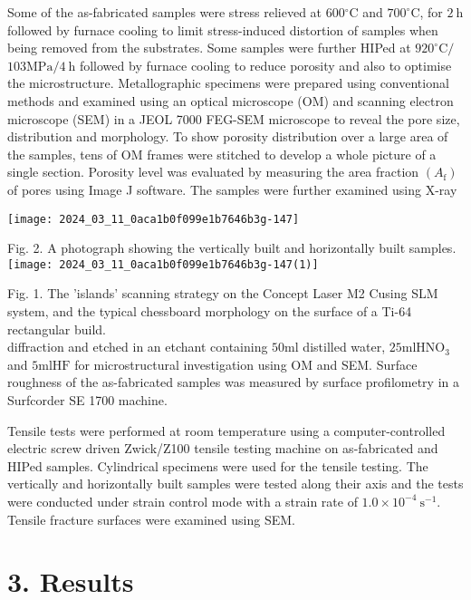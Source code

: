 \documentclass[10pt]{article}
\begin{document}
Some of the as-fabricated samples were stress relieved at $600{ }^{\circ} \mathrm{C}$ and $700^{\circ} \mathrm{C}$, for $2 \mathrm{~h}$ followed by furnace cooling to limit stress-induced distortion of samples when being removed from the substrates. Some samples were further HIPed at $920^{\circ} \mathrm{C} /$ $103 \mathrm{MPa} / 4 \mathrm{~h}$ followed by furnace cooling to reduce porosity and also to optimise the microstructure. Metallographic specimens were prepared using conventional methods and examined using an optical microscope (OM) and scanning electron microscope (SEM) in a JEOL 7000 FEG-SEM microscope to reveal the pore size, distribution and morphology. To show porosity distribution over a large area of the samples, tens of OM frames were stitched to develop a whole picture of a single section. Porosity level was evaluated by measuring the area fraction $\left(A_{\mathrm{f}}\right)$ of pores using Image J software. The samples were further examined using X-ray

\begin{center}
\texttt{[image: 2024\_03\_11\_0aca1b0f099e1b7646b3g-147]}
\end{center}

Fig. 2. A photograph showing the vertically built and horizontally built samples.\\
\texttt{[image: 2024\_03\_11\_0aca1b0f099e1b7646b3g-147(1)]}

Fig. 1. The 'islands' scanning strategy on the Concept Laser M2 Cusing SLM system, and the typical chessboard morphology on the surface of a Ti-64 rectangular build.\\
diffraction and etched in an etchant containing $50 \mathrm{ml}$ distilled water, $25 \mathrm{ml} \mathrm{HNO}_{3}$ and $5 \mathrm{ml} \mathrm{HF}$ for microstructural investigation using OM and SEM. Surface roughness of the as-fabricated samples was measured by surface profilometry in a Surfcorder SE 1700 machine.

Tensile tests were performed at room temperature using a computer-controlled electric screw driven Zwick/Z100 tensile testing machine on as-fabricated and HIPed samples. Cylindrical specimens were used for the tensile testing. The vertically and horizontally built samples were tested along their axis and the tests were conducted under strain control mode with a strain rate of $1.0 \times 10^{-4} \mathrm{~s}^{-1}$. Tensile fracture surfaces were examined using SEM.

\section*{3. Results}
\end{document}
